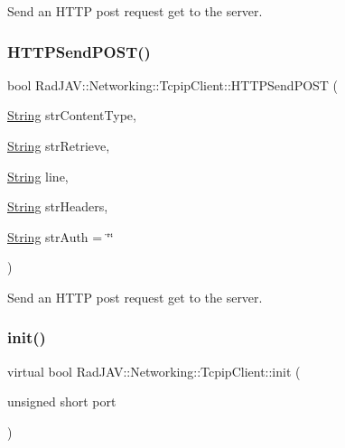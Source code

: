 Send an H\+T\+TP post request get to the server. 

\mbox{\label{class_rad_j_a_v_1_1_networking_1_1_tcpip_client_a396c8c2729b10ece40ff82b733a89cc0}} 
\subsubsection{\texorpdfstring{H\+T\+T\+P\+Send\+P\+O\+S\+T()}{HTTPSendPOST()}\hspace{0.1cm}{\footnotesize\ttfamily [2/2]}}
{\footnotesize\ttfamily bool Rad\+J\+A\+V\+::\+Networking\+::\+Tcpip\+Client\+::\+H\+T\+T\+P\+Send\+P\+O\+ST (\begin{DoxyParamCaption}\item[{\mbox{\hyperlink{class_rad_j_a_v_1_1_string}{String}}}]{str\+Content\+Type,  }\item[{\mbox{\hyperlink{class_rad_j_a_v_1_1_string}{String}}}]{str\+Retrieve,  }\item[{\mbox{\hyperlink{class_rad_j_a_v_1_1_string}{String}}}]{line,  }\item[{\mbox{\hyperlink{class_rad_j_a_v_1_1_string}{String}}}]{str\+Headers,  }\item[{\mbox{\hyperlink{class_rad_j_a_v_1_1_string}{String}}}]{str\+Auth = {\ttfamily \char`\"{}\char`\"{}} }\end{DoxyParamCaption})}



Send an H\+T\+TP post request get to the server. 

\mbox{\label{class_rad_j_a_v_1_1_networking_1_1_tcpip_client_aba21f2a319d4268bdf04525b1e35ccab}} 
\subsubsection{\texorpdfstring{init()}{init()}}
{\footnotesize\ttfamily virtual bool Rad\+J\+A\+V\+::\+Networking\+::\+Tcpip\+Client\+::init (\begin{DoxyParamCaption}\item[{unsigned short}]{port }\end{DoxyParamCaption})\hspace{0.3cm}{\ttfamily [pure virtual]}}




